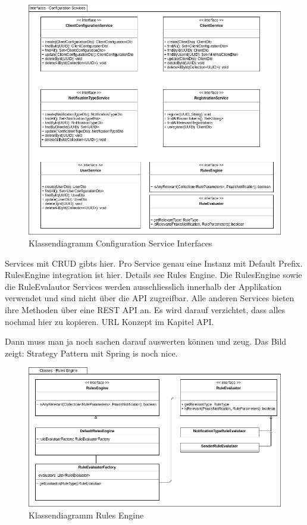 \clearpage

\begin{figure}[h]
    \centering
    \begin{minipage}[b]{1.0\textwidth}
        \includegraphics[width=\textwidth]{graphics/Class_Configuration_Services}
        \caption{Klassendiagramm Configuration Service Interfaces}
    \end{minipage}
\end{figure}
Services mit CRUD gibts hier.
Pro Service genau eine Instanz mit Default Prefix.
RulesEngine integration ist hier.
Details see Rules Engine.
Die RulesEngine sowie die RuleEvalautor Services werden ausschliesslich innerhalb der Applikation verwendet und sind nicht über die API zugreifbar.
Alle anderen Services bieten ihre Methoden über eine REST API an. Es wird darauf verzichtet, dass alles nochmal hier zu kopieren.
URL Konzept im Kapitel API.


\clearpage
Dann muss man ja noch sachen darauf auswerten können und zeug.
Das Bild zeigt: Strategy Pattern mit Spring is noch nice.

\begin{figure}[h]
    \centering
    \begin{minipage}[b]{1.0\textwidth}
        \includegraphics[width=\textwidth]{graphics/Class_Configuration_RulesEngine}
        \caption{Klassendiagramm Rules Engine}
    \end{minipage}
\end{figure}

